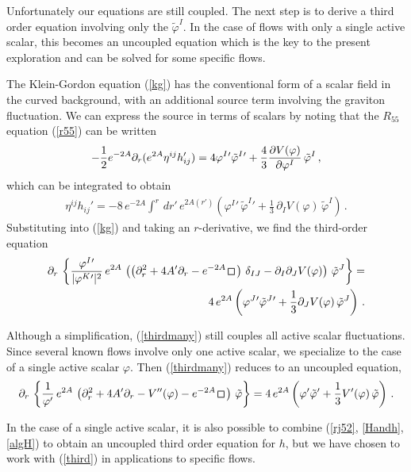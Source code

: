 \documentclass[a4paper,12pt]{article}
\def\varphit{\tilde{\varphi}}
\def\sqr#1#2{{\vcenter{\vbox{\hrule height.#2pt
         \hbox{\vrule width.#2pt height#1pt \kern#1pt
            \vrule width.#2pt}
         \hrule height.#2pt}}}}
\def\square{\mathop{\mathchoice\sqr56\sqr56\sqr{3.75}4\sqr34\,}\nolimits}
\begin{document}
Unfortunately our equations are still coupled. The next step is to
derive a third order equation involving only the $\varphit^I$. In the
case of flows with only a single active scalar, this becomes an
uncoupled equation which is the key to the present exploration and can be
solved for some specific flows. 

The Klein-Gordon equation (\ref{kg}) has the conventional form of a
scalar field in the curved background, with an additional source term
involving the graviton fluctuation.  We can express the source in
terms of scalars by noting that the $R_{55}$ equation (\ref{r55}) can
be written
\begin{eqnarray}
- \frac{1}{2} e^{-2A} \partial_r (e^{2A} \eta^{ij} h_{ij}') = 4 \varphi^I{}'
 \tilde{\varphi}^I{}' + {4 \over 3} {\partial V(\varphi) \over \partial \varphi^I}
 \, \tilde{\varphi}^I \,,
\end{eqnarray}
which can be integrated to obtain
\begin{eqnarray}
\eta^{ij} h_{ij}' = - 8 \, e^{-2A} \int^r \, dr' \, e^{2A(r')} \left(
\varphi^I{}' \, \varphit^I{}' + \frac{1}{3} \, \partial_I  V(\varphi) \, \varphit^I \right) \,.
\end{eqnarray}
Substituting into (\ref{kg}) and taking an $r$-derivative,
we find the third-order equation 
\begin{eqnarray}
\label{thirdmany}
\partial_r \, \left\{ \frac{\varphi^I{}'}{|\varphi^K{}'|^2} \, e^{2A} \,
\left( \left( \partial_r^2 + 4A' \partial_r- e^{-2A} \square \right) \,
\delta_{IJ} - \partial_I \partial_J V(\varphi) \right) \, \varphit^J \right\} = \\
4 \, e^{2A} \left( \varphi^J{}' \varphit^J{}' + \frac{1}{3} \partial_J
V(\varphi) \, \varphit^J \right) \,. \nonumber
\end{eqnarray}

Although a simplification, (\ref{thirdmany}) still couples all active
scalar fluctuations.  Since several known flows involve only one
active scalar, we
specialize to the case of a single active scalar $\varphi$. 
Then (\ref{thirdmany}) reduces to an uncoupled equation,
\begin{eqnarray}
\label{third}
\partial_r \, \left\{ \frac{1}{\varphi'} \, e^{2A} \, \left( \partial_r^2 +
4A' \partial_r - V''(\varphi) - e^{-2A} \square \right) \, \varphit \right\}
= 4 \, e^{2A} \left( \varphi' \varphit' + \frac{1}{3} V'(\varphi) \, \varphit
\right) \,.
\end{eqnarray}

In the case of a single active scalar, it is also possible to combine
(\ref{rj52}, \ref{Handh}, \ref{algH}) to obtain an uncoupled third order
equation for $h$, but we have chosen to work with (\ref{third}) in
applications to specific flows.
\end{document}
